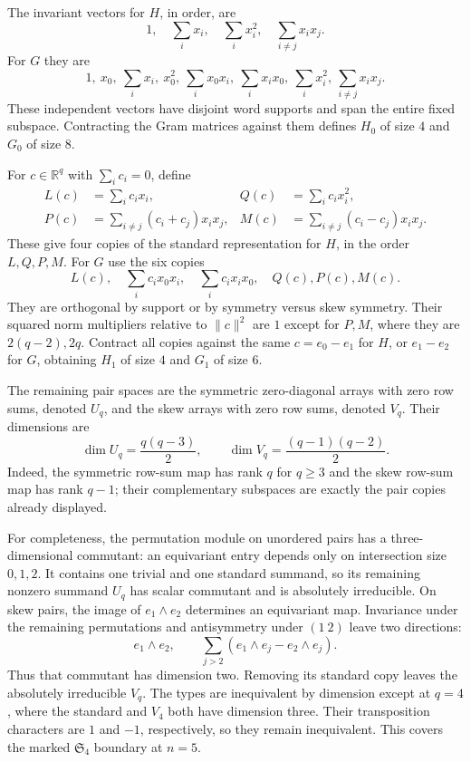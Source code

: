 \documentclass[11pt]{article}
\newcommand{\Sym}{\mathfrak S}
\newcommand{\R}{\mathbb R}
\begin{document}
The invariant vectors for $H$, in order, are
\[
 1,\quad \sum_i x_i,\quad\sum_i x_i^2,\quad\sum_{i\ne j}x_ix_j.
\]
For $G$ they are
\[
 1,\ x_0,\ \sum_i x_i,\ x_0^2,\ \sum_i x_0x_i,\
 \sum_i x_ix_0,\ \sum_i x_i^2,\ \sum_{i\ne j}x_ix_j.
\]
These independent vectors have disjoint word supports and span the
entire fixed subspace. Contracting the Gram matrices against them defines
$H_0$ of size $4$ and $G_0$ of size $8$.

For $c\in\R^q$ with $\sum_i c_i=0$, define
\begin{align*}
 L(c)&=\sum_i c_ix_i,& Q(c)&=\sum_i c_ix_i^2,\\
 P(c)&=\sum_{i\ne j}(c_i+c_j)x_ix_j,&
 M(c)&=\sum_{i\ne j}(c_i-c_j)x_ix_j.
\end{align*}
These give four copies of the standard representation for $H$, in the
order $L,Q,P,M$. For $G$ use the six copies
\[
 L(c),\quad\sum_i c_ix_0x_i,\quad\sum_i c_ix_ix_0,\quad Q(c),P(c),M(c).
\]
They are orthogonal by support or by symmetry versus skew symmetry.
Their squared norm multipliers relative to $\|c\|^2$ are $1$ except
for $P,M$, where they are $2(q-2),2q$. Contract all copies against
the same $c=e_0-e_1$ for $H$, or $e_1-e_2$ for $G$, obtaining
$H_1$ of size $4$ and $G_1$ of size $6$.

The remaining pair spaces are the symmetric zero-diagonal arrays with
zero row sums, denoted $U_q$, and the skew arrays with zero row sums,
denoted $V_q$. Their dimensions are
\[
 \dim U_q=\frac{q(q-3)}2,\qquad
 \dim V_q=\frac{(q-1)(q-2)}2.
\]
Indeed, the symmetric row-sum map has rank $q$ for $q\ge3$ and the
skew row-sum map has rank $q-1$; their complementary subspaces are
exactly the pair copies already displayed.

For completeness, the permutation module on unordered pairs has a
three-dimensional commutant: an equivariant entry depends only on
intersection size $0,1,2$. It contains one trivial and one standard
summand, so its remaining nonzero summand $U_q$ has scalar commutant
and is absolutely irreducible. On skew pairs, the image of
$e_1\wedge e_2$ determines an equivariant map. Invariance under the
remaining permutations and antisymmetry under $(1\ 2)$ leave two
directions:
\[
 e_1\wedge e_2,\qquad
 \sum_{j>2}(e_1\wedge e_j-e_2\wedge e_j).
\]
Thus that commutant has dimension two. Removing its standard copy
leaves the absolutely irreducible $V_q$. The types are inequivalent
by dimension except at $q=4$, where the standard and $V_4$ both have
dimension three. Their transposition characters are $1$ and $-1$,
respectively, so they remain inequivalent. This covers the marked
$\Sym_4$ boundary at $n=5$.
\end{document}

